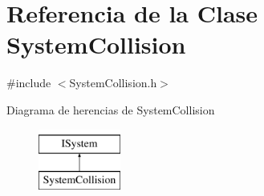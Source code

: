 \hypertarget{classSystemCollision}{}\section{Referencia de la Clase System\+Collision}
\label{classSystemCollision}


{\ttfamily \#include $<$System\+Collision.\+h$>$}

Diagrama de herencias de System\+Collision\begin{figure}[H]
\begin{center}
\leavevmode
\includegraphics[height=2.000000cm]{classSystemCollision}
\end{center}
\end{figure}
